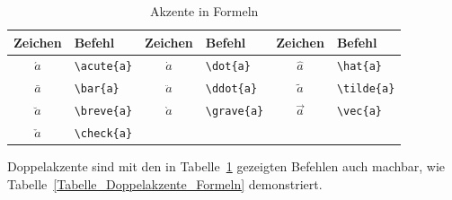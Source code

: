 \documentclass[a4paper,10pt,twoside]{scrbook}
\begin{document}
\begin{table}[h!tb]
\centering
\caption{Akzente in Formeln}
\label{Tabelle_Akzente_Formeln}       %
\begin{tabular}{clclcl}
\hline
Zeichen & Befehl & Zeichen & Befehl & Zeichen & Befehl \\
\hline
$\acute{a}$ & \texttt{\textbackslash acute\{a\}} & 
$\dot{a}$ & \texttt{\textbackslash dot\{a\}} &
$\hat{a}$ & \texttt{\textbackslash hat\{a\}} \\
$\bar{a}$ & \texttt{\textbackslash bar\{a\}} &
$\ddot{a}$ & \texttt{\textbackslash ddot\{a\}} &
$\tilde{a}$ & \texttt{\textbackslash tilde\{a\}} \\
$\breve{a}$ & \texttt{\textbackslash breve\{a\}} &
$\grave{a}$ & \texttt{\textbackslash grave\{a\}} &
$\vec{a}$ & \texttt{\textbackslash vec\{a\}} \\
$\check{a}$ & \texttt{\textbackslash check\{a\}} &
  & \\
\hline
\end{tabular}
\end{table}

Doppelakzente sind mit den in Tabelle~\ref{Tabelle_Akzente_Formeln} gezeigten
Befehlen auch machbar, wie Tabelle~\ref{Tabelle_Doppelakzente_Formeln} demonstriert.
\end{document}
